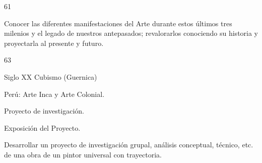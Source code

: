 \begin{syllabus}
\begin{unit}{}{}{6}{1}
\begin{learningoutcomes}
	\item Conocer las diferentes manifestaciones del Arte durante estos últimos tres milenios y el legado de nuestros antepasados; revalorarlos conociendo su historia y proyectarla al presente y futuro.
\end{learningoutcomes}
\end{unit}

\begin{unit}{}{}{6}{3}
\begin{topics}
	\item Siglo XX Cubismo (Guernica)
	\item Perú: Arte Inca y Arte Colonial.
	\item Proyecto de investigación.
	\item Exposición del Proyecto.
\end{topics}
\begin{learningoutcomes}
	\item Desarrollar un proyecto de investigación grupal, análisis conceptual, técnico, etc. de una obra de un pintor universal con trayectoria.
\end{learningoutcomes}
\end{unit}



\begin{coursebibliography}
\end{coursebibliography}
\end{syllabus}
